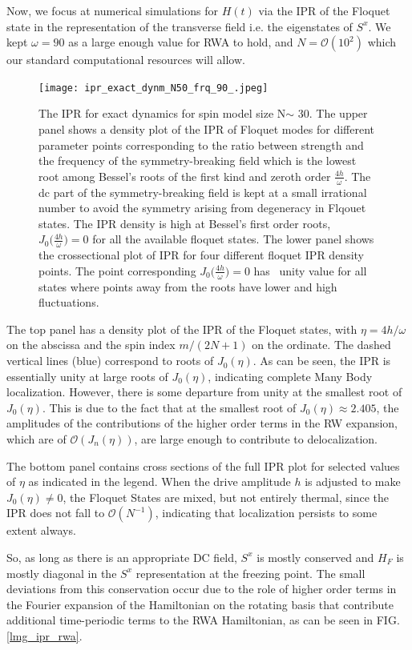 \documentclass[%
reprint,
superscriptaddress,
amsmath,amssymb,
aps,
prb,
]{revtex4-2}
\begin{document}
	
	Now, we focus at numerical simulations for $H(t)$ via the IPR of the Floquet state in the representation of the transverse field i.e. the eigenstates of $S^x$. We kept $\omega = 90$ as a large enough value for RWA to hold, and $N=\mathcal{O}(10^2)$ which our standard computational resources will allow. 
	
	\begin{figure}[ht!]
		\centering
		\texttt{[image: ipr\_exact\_dynm\_N50\_frq\_90\_.jpeg]}
		\caption{The IPR for exact dynamics for spin model size N$\sim$ 30. The upper panel shows a density plot of the IPR of Floquet modes for different parameter points corresponding to the ratio between strength and the frequency of the symmetry-breaking field which is the lowest root among Bessel's roots of the first kind and zeroth order $\frac{4h}{\omega}$. The dc part of the symmetry-breaking field is kept at a small irrational number to avoid the symmetry arising from degeneracy in Flqouet states. The IPR density is high at Bessel's first order roots, $J_0\Big(\frac{4h}{\omega}\Big)=0$ for all the available floquet states. The lower panel shows the crossectional plot of IPR for four different floquet IPR density points. The point corresponding $J_0\Big(\frac{4h}{\omega}\Big)=0$ has ~unity value for all states where points away from the roots have lower and high fluctuations.}
		\label{lmg_ipr_exact}
	\end{figure}
	The top panel has a density plot of the IPR of the Floquet states, with $\eta=4h/\omega$ on the abscissa and the spin index $m/(2N+1)$ on the ordinate. The dashed vertical lines (blue) correspond to roots of $J_0(\eta)$. As can be seen, the IPR is essentially unity at large roots of $J_0(\eta)$, indicating complete Many Body localization. However, there is some departure from unity at the smallest root of $J_0(\eta)$. This is due to the fact that at the smallest root of $J_0(\eta)\approx 2.405$, the amplitudes of the contributions of the higher order terms in the RW expansion, which are of $\mathcal{O}(J_n(\eta))$, are large enough to contribute to delocalization.
	
	The bottom panel contains cross sections of the full IPR plot for selected values of $\eta$ as indicated in the legend. When the drive amplitude $h$ is adjusted to make $J_0(\eta)\neq 0$, the Floquet States are mixed, but not entirely thermal, since the IPR does not fall to $\mathcal{O}(N^{-1})$, indicating that localization persists to some extent always.
	
	So, as long as there is an appropriate DC field, $S^x$ is mostly conserved and $H_F$ is mostly diagonal in the $S^x$ representation at the freezing point. The small deviations from this conservation occur due to the role of higher order terms in the Fourier expansion of the Hamiltonian on the rotating basis that contribute additional time-periodic terms to the RWA Hamiltonian, as can be seen in FIG.\ref{lmg_ipr_rwa}.
	
\end{document}
